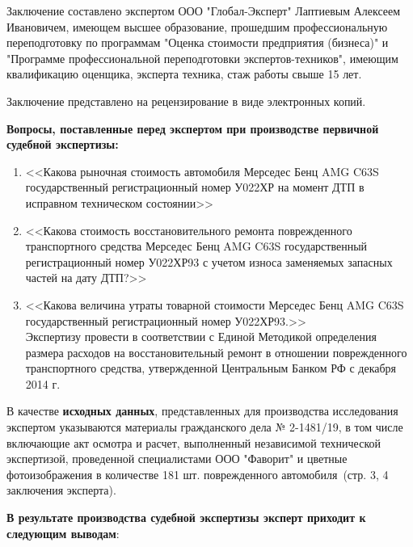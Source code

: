 Заключение составлено экспертом ООО "Глобал-Эксперт" Лаптиевым Алексеем Ивановичем, имеющем высшее образование, прошедшим профессиональную переподготовку по программам "Оценка стоимости предприятия (бизнеса)" и "Программе профессиональной переподготовки экспертов-техников", имеющим квалификацию оценщика, эксперта техника, стаж работы свыше 15 лет. 

 Заключение представлено на рецензирование в виде электронных копий.


\textbf{Вопросы, поставленные перед экспертом при производстве первичной судебной экспертизы:}

\begin{enumerate}
	\item <<Какова рыночная стоимость автомобиля Мерседес Бенц AMG C63S государственный регистрационный номер У022ХР на момент ДТП  в исправном техническом состоянии>>
	\item <<Какова стоимость восстановительного ремонта поврежденного транспортного средства Мерседес Бенц AMG C63S государственный регистрационный номер У022ХР93 с учетом износа заменяемых запасных частей на дату ДТП?>>
	\item <<Какова величина утраты товарной стоимости Мерседес Бенц AMG C63S государственный регистрационный номер У022ХР93.>>	\vspace{2mm}\\
	
	Экспертизу провести в соответствии с Единой Методикой определения размера расходов на восстановительный ремонт в отношении поврежденного транспортного средства, утвержденной Центральным Банком РФ с  декабря 2014 г.
\end{enumerate}

	\vspace{2mm}
 В качестве  \textbf{исходных данных}, представленных для производства исследования экспертом указываются  материалы гражданского дела № 2-1481/19, в том числе включающие акт осмотра и расчет, выполненный независимой технической экспертизой, проведенной специалистами ООО "Фаворит"  и цветные фотоизображения в количестве 181 шт. поврежденного автомобиля \,(стр. 3, 4 заключения эксперта). 
	\vspace{2mm}
	
\par  \textbf{В результате  производства судебной экспертизы эксперт приходит к следующим выводам}: 

